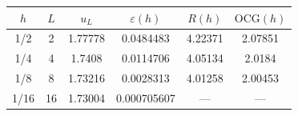 \begin{tabular}{cccccc}
\toprule
$h$ & $L$ & $u_L$ & $\varepsilon(h)$ & $R(h)$ & $\mathrm{OCG}(h)$ \\
\midrule
1/2 & 2 & 1.77778 & 0.0484483 & 4.22371 & 2.07851 \\
1/4 & 4 & 1.7408 & 0.0114706 & 4.05134 & 2.0184 \\
1/8 & 8 & 1.73216 & 0.0028313 & 4.01258 & 2.00453 \\
1/16 & 16 & 1.73004 & 0.000705607 & --- & --- \\
\bottomrule
\end{tabular}
